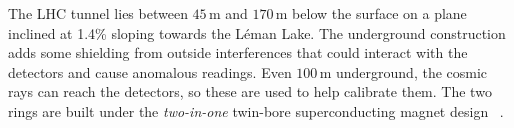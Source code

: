 The LHC tunnel lies between $45\,$m and $170\,$m below the surface on a plane inclined at 1.4\% sloping towards the Léman Lake.
The underground construction adds some shielding from outside interferences that could interact with the detectors and cause 
anomalous readings. Even $100\,$m underground, the cosmic rays can reach the detectors, so these are used to help calibrate them.
The two rings are built under the \textit{two-in-one} twin-bore superconducting magnet design~\cite{Evans_2008} .%



